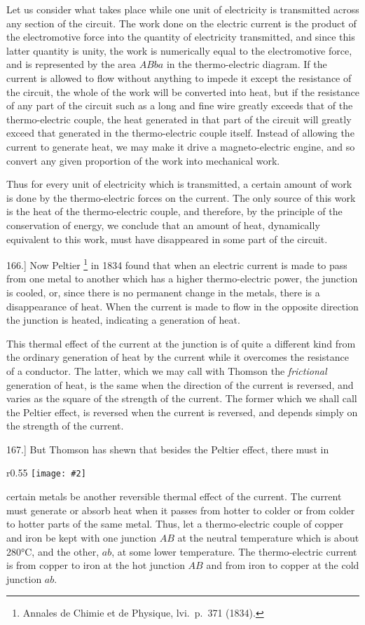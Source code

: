 \documentclass[12pt,oneside]{book}[2021/10/04]
\let\oldfootnote\footnote
\renewcommand\footnote[1]{%
\oldfootnote{\hspace{0.14em}#1}}
\newcommand{\Runhead}[1]{\fancyhead[C]{\iffloatpage{}{\small#1}}}
\newcommand{\article}[1]{\phantomsection \label{art:#1}{#1.]}}
\newcommand{\wrapfig}[3]{
\begin{wrapfigure}{r}{#1\textwidth}
\centering
\texttt{[image: \#2]}
\caption*{\small #3}
\end{wrapfigure}}
\newcommand{\¬}{\hphantom{0}}
\begin{document}
Let us consider what takes place while one unit of electricity
is transmitted across any section of the circuit. The work done
on the electric current is the product of the electromotive force
into the quantity of electricity transmitted, and since this latter
quantity is unity, the work is numerically equal to the electromotive
force, and is represented by the area \(ABba\) in the thermo-electric
diagram. If the current is allowed to flow without
anything to impede it except the resistance of the circuit, the
whole of the work will be converted into heat, but if the resistance
of any part of the circuit such as a long and fine wire greatly
exceeds that of the thermo-electric couple, the heat generated in
that part of the circuit will greatly exceed that generated in the
thermo-electric couple itself. Instead of allowing the current to
generate heat, we may make it drive a magneto-electric engine,
and so convert any given proportion of the work into mechanical
work.

Thus for every unit of electricity which is transmitted, a certain
amount of work is done by the thermo-electric forces on the current.
The only source of this work is the heat of the thermo-electric
couple, and therefore, by the principle of the conservation of energy,
we conclude that an amount of heat, dynamically equivalent to this
work, must have disappeared in some part of the circuit.

\article{166} Now Peltier\footnote{
Annales de Chimie et de Physique, lvi.\ p.\ 371 (1834).} in 1834 found that when an electric current
is made to pass from one metal to another which has a higher
thermo-electric power, the junction is cooled, or, since there is no
permanent change in the metals, there is a disappearance of heat.
When the current is made to flow in the opposite direction the
junction is heated, indicating a generation of heat.
\Runhead{PELTIER EFFECT.}

This thermal effect of the current at the junction is of quite
a different kind from the ordinary generation of heat by the current
while it overcomes the resistance of a conductor. The latter,
which we may call with Thomson the \textit{frictional} generation of heat,
is the same when the direction of the current is reversed, and
varies as the square of the strength of the current. The former
which we shall call the Peltier effect, is reversed when the current
is reversed, and depends simply on the strength of the current.

\article{167} But Thomson has shewn that besides the Peltier effect,
there must in
\wrapfig{0.55}{152.png}{Fig. 37.}
certain metals be another reversible thermal effect
of the current. The current must generate or absorb heat when
it passes from hotter to colder or from colder to hotter parts of
the same metal. Thus, let a thermo-electric couple of copper and
iron be kept with one junction \(AB\) at the neutral temperature
which is about 280°C, and the other, \(ab\), at some lower temperature.
The thermo-electric current is from copper to iron at the hot
junction \(AB\) and from iron to copper at the cold junction \(ab\).
\end{document}
